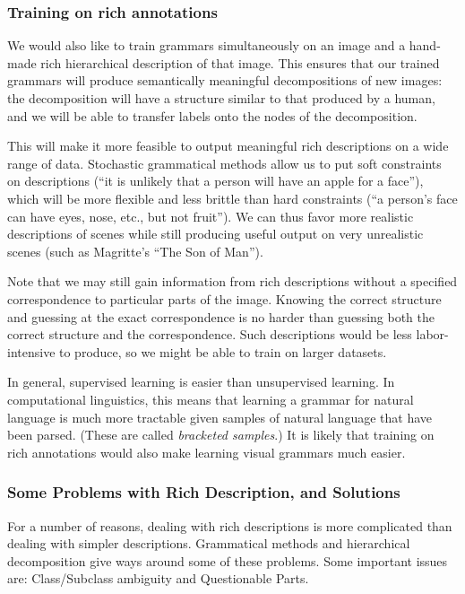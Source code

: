 \documentclass{article}
\begin{document}
\subsubsection{Training on rich annotations}

We would also like to train grammars simultaneously on an image and a
hand-made rich hierarchical description of that image. This ensures
that our trained grammars will produce semantically meaningful
decompositions of new images: the decomposition will have a structure
similar to that produced by a human, and we will be able to transfer
labels onto the nodes of the decomposition.

This will make it more feasible to output meaningful rich descriptions
on a wide range of data. Stochastic grammatical methods allow us to
put soft constraints on descriptions (``it is unlikely that a person
will have an apple for a face''), which will be more flexible and less
brittle than hard constraints (``a person's face can have eyes, nose,
etc., but not fruit''). We can thus favor more realistic descriptions
of scenes while still producing useful output on very unrealistic
scenes (such as Magritte's ``The Son of Man'').

Note that we may still gain information from rich descriptions without
a specified correspondence to particular parts of the image. Knowing
the correct structure and guessing at the exact correspondence is no
harder than guessing both the correct structure and the
correspondence. Such descriptions would be less labor-intensive to
produce, so we might be able to train on larger datasets.

In general, supervised learning is easier than unsupervised
learning. In computational linguistics, this means that learning a
grammar for natural language is much more tractable given samples of
natural language that have been parsed. (These are called
\emph{bracketed samples}.) It is likely that training on rich
annotations would also make learning visual grammars much easier.

\subsubsection{Some Problems with Rich Description, and Solutions}

For a number of reasons, dealing with rich descriptions is more
complicated than dealing with simpler descriptions. Grammatical
methods and hierarchical decomposition give ways around some of these
problems. Some important issues are: Class/Subclass ambiguity
and Questionable Parts.
\end{document}
